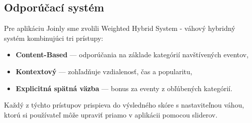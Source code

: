 \subsection{Odporúčací systém}                                                                                                                                                                                                   
                                                                                          
  Pre aplikáciu Joinly sme zvolili Weighted Hybrid System -
  váhový hybridný systém kombinujúci tri prístupy:
                                          
  \begin{itemize}[noitemsep, nolistsep]                                                                                                                                                                                                                 
      \item \textbf{Content-Based} — odporúčania na základe kategórií                                                                                                                                                                          navštívených eventov,                                                                                                                                                                                                  
      \item \textbf{Kontextový} — zohľadňuje vzdialenosť, čas a popularitu,                                                                                                                                                        
      \item \textbf{Explicitná spätná väzba} — bonus za eventy z obľúbených
            kategórií.
  \end{itemize}

  Každý z týchto prístupov prispieva do výsledného skóre s nastaviteľnou
  váhou, ktorú si používateľ môže upraviť priamo v aplikácii pomocou sliderov.

